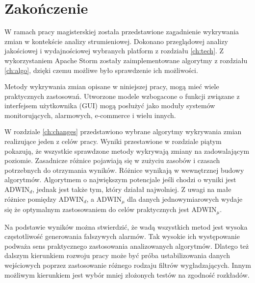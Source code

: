 \chapter{Zakończenie}
W ramach pracy magisterskiej została przedstawione zagadnienie wykrywania zmian w kontekście analizy strumieniowej.
Dokonano przeglądowej analizy jakościowej i wydajnościowej wybranych platform z rozdziału \ref{ch:tech}.
Z wykorzystaniem Apache Storm zostały zaimplementowane algorytmy z rozdziału \ref{ch:algo},
dzięki czemu możliwe było sprawdzenie ich możliwości.

Metody wykrywania zmian opisane w niniejszej pracy,
mogą mieć wiele praktycznych zastosowań.
Utworzone modele wzbogacone o funkcji związane z interfejsem użytkownika (GUI) mogą posłużyć
jako moduły systemów monitorujących, alarmowych, e-commerce i wielu innych.

W rozdziale \ref{ch:changes} przedstawiono wybrane algorytmy wykrywania zmian realizujące jeden z celów pracy.
Wyniki przestawione w rozdziale piątym pokazują,
że wszystkie sprawdzone metody wykrywają zmiany na zadowalającym poziomie.
Zasadnicze różnice pojawiają się w zużyciu zasobów i czasach potrzebnych do otrzymania wyników.
Różnice wynikają w wewnętrznej budowy algorytmów.
Algorytmem o największym potencjale jeśli chodzi o wyniki jest $\mbox{ADWIN}_d$,
jednak jest także tym, który działał najwolniej.
Z uwagi na małe różnice pomiędzy $\mbox{ADWIN}_d$, a $\mbox{ADWIN}_\mu$ dla danych jednowymiarowych
wydaje się że optymalnym zastosowaniem do celów praktycznych jest $\mbox{ADWIN}_\mu$.

Na podstawie wyników można stwierdzić,
że wadą wszystkich metod jest wysoka częstotliwość generowania fałszywych alarmów.
Tak wysokie ich występowanie podważa sens praktycznego zastosowania analizowanych algorytmów.
Dlatego też dalszym kierunkiem rozwoju pracy może być próba ustabilizowania danych wejściowych
poprzez zastosowanie różnego rodzaju filtrów wygładzających.
Innym możliwym kierunkiem jest wybór mniej złożonych testów na zgodność rozkładów.
